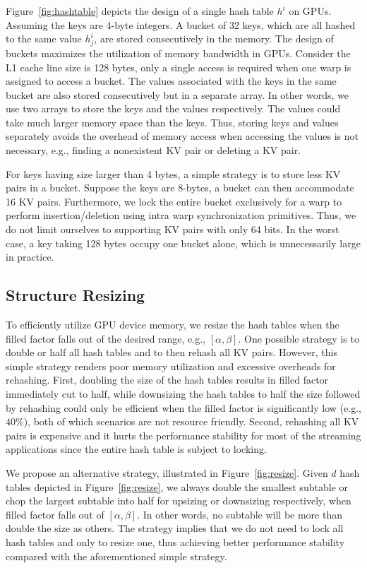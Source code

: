 Figure~\ref{fig:hashtable} depicts the design of a single hash table $h^i$ on GPUs. 
Assuming the keys are 4-byte integers. A bucket of 32 keys, which are all hashed to the same value $h^i_j$, are stored consecutively in the memory. 
The design of buckets maximizes the utilization of memory bandwidth in GPUs. 
Consider the L1 cache line size is 128 bytes, only a single access is required when one warp is assigned to access a bucket. 
The values associated with the keys in the same bucket are also stored consecutively but in a separate array.   
In other words, we use two arrays to store the keys and the values respectively.
The values could take much larger memory space than the keys. 
Thus, storing keys and values separately avoids the overhead of memory access when accessing the values is not necessary, 
e.g., finding a nonexistent KV pair or deleting a KV pair. 

For keys having size larger than 4 bytes, a simple strategy is to store less KV pairs in a bucket. Suppose the keys are 8-bytes, a bucket can then accommodate 16 KV pairs. 
Furthermore, we lock the entire bucket exclusively for a warp to perform insertion/deletion using intra warp synchronization primitives. Thus, we do not limit ourselves to supporting KV pairs with only 64 bits. 
In the worst case, a key taking 128 bytes occupy one bucket alone, which is unnecessarily large in practice.

\subsection{Structure Resizing}\label{sec:dyn:resize}
To efficiently utilize GPU device memory, we resize the hash tables when the filled factor falls out of the desired range, e.g., $[\alpha,\beta]$.
One possible strategy is to double or half all hash tables and to then rehash all KV pairs. However, this simple strategy renders poor memory utilization and 
excessive overheads for rehashing. First, doubling the size of the hash tables results in filled factor immediately cut to half, while downsizing the hash tables to half the size followed by rehashing could only be efficient when the filled factor is significantly low (e.g., $40\%$), both of which scenarios are not resource friendly. Second, rehashing all KV pairs is expensive and it hurts the performance stability for most of the streaming applications since the entire hash table is subject to locking. 

We propose an alternative strategy, illustrated in Figure~\ref{fig:resize}. 
Given $d$ hash tables depicted in Figure~\ref{fig:resize},
we always double the smallest subtable or chop the largest subtable into half for upsizing or downsizing respectively, when filled factor falls out of $[\alpha,\beta]$. 
In other words, no subtable will be more than double the size as others. The strategy implies that we do not need to lock all hash tables and only to resize one, thus achieving better performance stability compared with the aforementioned simple strategy. 

